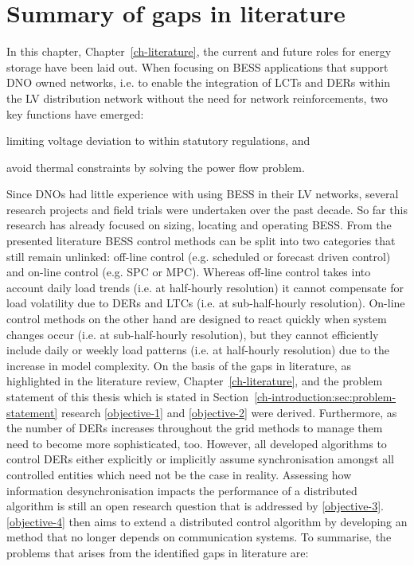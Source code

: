 \section{Summary of gaps in literature}
\label{ch-literature:sec:literature-gaps}

In this chapter, Chapter~\ref{ch-literature}, the current and future roles for energy storage have been laid out.
When focusing on BESS applications that support DNO owned networks, i.e. to enable the integration of LCTs and DERs within the LV distribution network without the need for network reinforcements, two key functions have emerged:
\begin{enumerate*}
	\item limiting voltage deviation to within statutory regulations, and
	\item avoid thermal constraints by solving the power flow problem.
\end{enumerate*}
Since DNOs had little experience with using BESS in their LV networks, several research projects and field trials were undertaken over the past decade.
So far this research has already focused on sizing, locating and operating BESS.
From the presented literature BESS control methods can be split into two  categories that still remain unlinked: off-line control (e.g. scheduled or forecast driven control) and on-line control (e.g. SPC or MPC).
Whereas off-line control takes into account daily load trends (i.e. at half-hourly resolution) it cannot compensate for load volatility due to DERs and LTCs (i.e. at sub-half-hourly resolution).
On-line control methods on the other hand are designed to react quickly when system changes occur (i.e. at sub-half-hourly resolution), but they cannot efficiently include daily or weekly load patterns (i.e. at half-hourly resolution) due to the increase in model complexity.
On the basis of the gaps in literature, as highlighted in the literature review, Chapter~\ref{ch-literature}, and the problem statement of this thesis which is stated in Section~\ref{ch-introduction:sec:problem-statement} research \ref{objective-1} and \ref{objective-2} were derived.
Furthermore, as the number of DERs increases throughout the grid methods to manage them need to become more sophisticated, too.
However, all developed algorithms to control DERs either explicitly or implicitly assume synchronisation amongst all controlled entities which need not be the case in reality.
Assessing how information desynchronisation impacts the performance of a distributed algorithm is still an open research question that is addressed by \ref{objective-3}.
\ref{objective-4} then aims to extend a distributed control algorithm by developing an method that no longer depends on communication systems.
To summarise, the problems that arises from the identified gaps in literature are:

